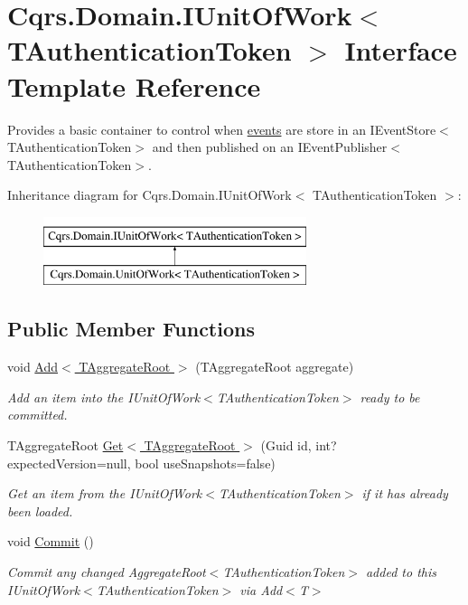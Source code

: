 \hypertarget{interfaceCqrs_1_1Domain_1_1IUnitOfWork}{}\section{Cqrs.\+Domain.\+I\+Unit\+Of\+Work$<$ T\+Authentication\+Token $>$ Interface Template Reference}
\label{interfaceCqrs_1_1Domain_1_1IUnitOfWork}


Provides a basic container to control when \hyperlink{}{events} are store in an I\+Event\+Store$<$\+T\+Authentication\+Token$>$ and then published on an I\+Event\+Publisher$<$\+T\+Authentication\+Token$>$.  


Inheritance diagram for Cqrs.\+Domain.\+I\+Unit\+Of\+Work$<$ T\+Authentication\+Token $>$\+:\begin{figure}[H]
\begin{center}
\leavevmode
\includegraphics[height=2.000000cm]{interfaceCqrs_1_1Domain_1_1IUnitOfWork}
\end{center}
\end{figure}
\subsection*{Public Member Functions}
\begin{DoxyCompactItemize}
\item 
void \hyperlink{interfaceCqrs_1_1Domain_1_1IUnitOfWork_a786ebca85b4ef7294b98280230ef1397_a786ebca85b4ef7294b98280230ef1397}{Add$<$ T\+Aggregate\+Root $>$} (T\+Aggregate\+Root aggregate)
\begin{DoxyCompactList}\small\item\em Add an item into the I\+Unit\+Of\+Work$<$\+T\+Authentication\+Token$>$ ready to be committed. \end{DoxyCompactList}\item 
T\+Aggregate\+Root \hyperlink{interfaceCqrs_1_1Domain_1_1IUnitOfWork_aee78f81d472577a65356bc1c05207180_aee78f81d472577a65356bc1c05207180}{Get$<$ T\+Aggregate\+Root $>$} (Guid id, int? expected\+Version=null, bool use\+Snapshots=false)
\begin{DoxyCompactList}\small\item\em Get an item from the I\+Unit\+Of\+Work$<$\+T\+Authentication\+Token$>$ if it has already been loaded. \end{DoxyCompactList}\item 
void \hyperlink{interfaceCqrs_1_1Domain_1_1IUnitOfWork_ade600c9bf9e8380c24eaf1e7e0df6e01_ade600c9bf9e8380c24eaf1e7e0df6e01}{Commit} ()
\begin{DoxyCompactList}\small\item\em Commit any changed Aggregate\+Root$<$\+T\+Authentication\+Token$>$ added to this I\+Unit\+Of\+Work$<$\+T\+Authentication\+Token$>$ via Add$<$\+T$>$ \end{DoxyCompactList}\end{DoxyCompactItemize}


